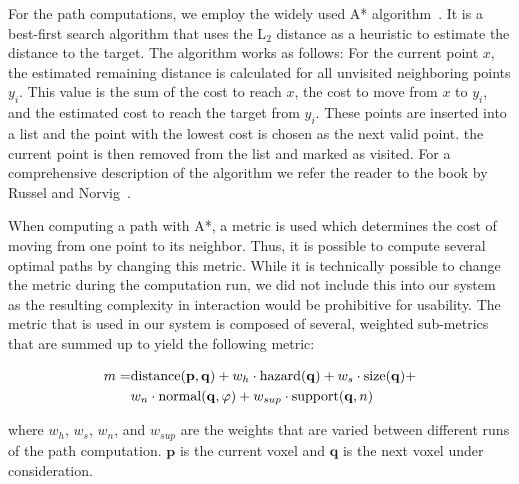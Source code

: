 \documentclass[conference,10pt,letter]{IEEEtran}
\begin{document}
For the path computations, we employ the widely used A* algorithm~\cite{4082128}. It is a best-first search algorithm that uses the L$_2$ distance as a heuristic to estimate the distance to the target. The algorithm works as follows: For the current point $x$, the estimated remaining distance is calculated for all unvisited neighboring points $y_i$. This value is the sum of the cost to reach $x$, the cost to move from $x$ to $y_i$, and the estimated cost to reach the target from $y_i$. These points are inserted into a list and the point with the lowest cost is chosen as the next valid point. the current point is then removed from the list and marked as visited. For a comprehensive description of the algorithm we refer the reader to the book by Russel and Norvig~\cite{AStar}.

When computing a path with A*, a metric is used which determines the cost of moving from one point to its neighbor. Thus, it is possible to compute several optimal paths by changing this metric. While it is technically possible to change the metric during the computation run, we did not include this into our system as the resulting complexity in interaction would be prohibitive for usability. The metric that is used in our system is composed of several, weighted sub-metrics that are summed up to yield the following metric:

\begin{equation}
\begin{array}{r@{}l}
m = & \textrm{distance}(\mathbf{p},\mathbf{q}) + w_h \cdot \textrm{hazard}(\mathbf{q}) + w_s \cdot \textrm{size}(\mathbf{q}) + \vspace*{0.1cm} \\
  & w_n \cdot \textrm{normal}(\mathbf{q},\varphi) + w_{sup} \cdot \textrm{support}(\mathbf{q},n)
\end{array}
\end{equation}


\noindent where $w_h$, $w_s$, $w_n$, and $w_{sup}$ are the weights that are varied between different runs of the path computation. $\mathbf{p}$ is the current voxel and $\mathbf{q}$ is the next voxel under consideration.
\end{document}
